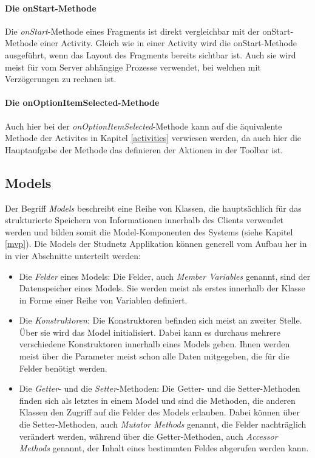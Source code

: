 \documentclass[../main.tex]{subfiles}
\begin{document}
	\paragraph{Die onStart-Methode}
	Die \emph{onStart}-Methode eines Fragments ist direkt vergleichbar mit der onStart-Methode einer Activity. Gleich wie in einer Activity wird die onStart-Methode ausgeführt, wenn das Layout des Fragments bereits sichtbar ist. Auch sie wird meist für vom Server abhängige Prozesse verwendet, bei welchen mit Verzögerungen zu rechnen ist.
	
	\paragraph{Die onOptionItemSelected-Methode}
	Auch hier bei der \emph{onOptionItemSelected}-Methode kann auf die äquivalente Methode der Activites in Kapitel \ref{activities} verwiesen werden, da auch hier die Hauptaufgabe der Methode das definieren der Aktionen in der Toolbar ist.
	
	\subsection{Models} \label{models}
	Der Begriff \emph{Models} beschreibt eine Reihe von Klassen, die hauptsächlich für das strukturierte Speichern von Informationen innerhalb des Clients verwendet werden und bilden somit die Model-Komponenten des Systems (siehe Kapitel \ref{mvp}). Die Models der Studnetz Applikation können generell vom Aufbau her in in vier Abschnitte unterteilt werden:
	
	\begin{itemize}
		\item Die \emph{Felder} eines Models: Die Felder, auch \emph{Member Variables} genannt, sind der Datenspeicher eines Models. Sie werden meist als erstes innerhalb der Klasse in Forme einer Reihe von Variablen definiert. \cite{memberVariables}
		\item Die \emph{Konstruktoren}: Die Konstruktoren befinden sich meist an zweiter Stelle. Über sie wird das Model initialisiert. Dabei kann es durchaus mehrere verschiedene Konstruktoren innerhalb eines Models geben. Ihnen werden meist über die Parameter meist schon alle Daten mitgegeben, die für die Felder benötigt werden.
		\item  Die \emph{Getter}- und die \emph{Setter}-Methoden: Die Getter- und die Setter-Methoden finden sich als letztes in einem Model und sind die Methoden, die anderen Klassen den Zugriff auf die Felder des Models erlauben. Dabei können über die Setter-Methoden, auch \emph{Mutator Methods} genannt, die Felder nachträglich verändert werden, während über die Getter-Methoden, auch \emph{Accessor Methods} genannt, der Inhalt eines bestimmten Feldes abgerufen werden kann. \cite{accessorsAndMutators}
	\end{itemize}
\end{document}
